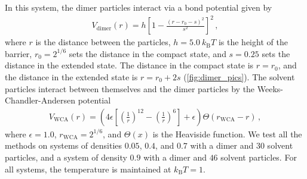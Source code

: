 \documentclass{article}
\numberwithin{equation}{section}
\theoremstyle{definition}
\theoremstyle{remark}
\begin{document}
In this system, the dimer particles interact via a bond potential given by
\begin{align}
    V_{\text{dimer}} \left( r \right) = h \left[ 1 - \frac{\left( r - r_{0} - s \right)^{2}}{s^2} \right]^{2} \,,
\end{align}
where $ r $ is the distance between the particles, $ h = 5.0 \ k_\mathrm{B} T $ is the height of the barrier, $ r_{0} = 2^{1/6} $ sets the distance in the compact state, and $ s= 0.25 $ sets the distance in the extended state.
The distance in the compact state is $ r = r_{0} $, and the distance in the extended state is $ r = r_{0} + 2 s $ (\cref{fig:dimer_pics}).
The solvent particles interact between themselves and the dimer particles by the Weeks-Chandler-Andersen potential \cite{weeks1971WCA}
\begin{align}
    V_{\text{WCA}} \left( r \right) = \left( 4 \epsilon \left[ \left( \frac{1}{r} \right)^{12} - \left( \frac{1}{r} \right)^{6} \right] + \epsilon \right) \Theta \left( r_{\text{WCA}} - r \right) \,,
\end{align}
where $\epsilon=1.0$, $ r_{\text{WCA}} = 2^{1/6} $, and $ \Theta \left( x \right) $ is the Heaviside function.
We test all the methods on systems of densities $ 0.05 $, $ 0.4 $, and $ 0.7 $ with a dimer and $ 30 $ solvent particles, and a system of density $ 0.9 $ with a dimer and $ 46 $ solvent particles. For all systems, the temperature is maintained at  $k_\mathrm{B} T=1$.
\end{document}
